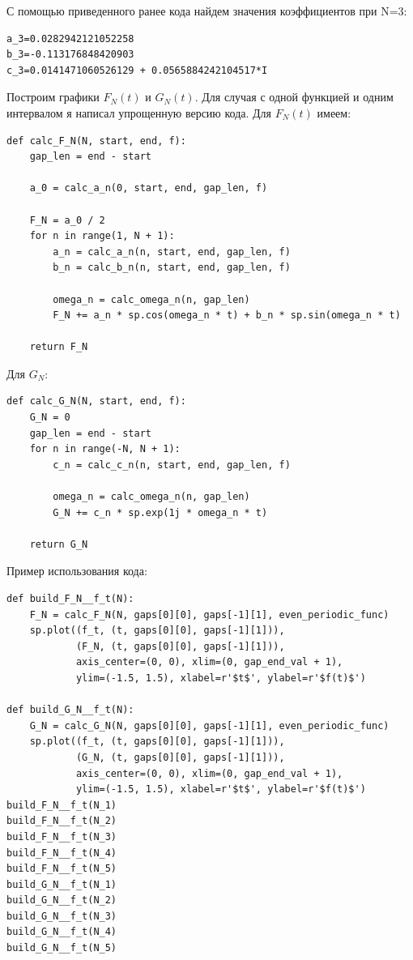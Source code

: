 \documentclass[a4paper, 16pt]{article}
\begin{document}
\noindent С помощью приведенного ранее кода найдем значения коэффициентов при N=3:
\begin{lstlisting}
a_3=0.0282942121052258
b_3=-0.113176848420903
c_3=0.0141471060526129 + 0.0565884242104517*I
\end{lstlisting}


\noindent Построим графики $F_N(t)$ и $G_N(t)$. Для случая с одной функцией и одним интервалом я написал
упрощенную версию кода. Для $F_N(t)$ имеем:
\begin{lstlisting}
def calc_F_N(N, start, end, f):
    gap_len = end - start

    a_0 = calc_a_n(0, start, end, gap_len, f)

    F_N = a_0 / 2
    for n in range(1, N + 1):
        a_n = calc_a_n(n, start, end, gap_len, f)
        b_n = calc_b_n(n, start, end, gap_len, f)

        omega_n = calc_omega_n(n, gap_len)
        F_N += a_n * sp.cos(omega_n * t) + b_n * sp.sin(omega_n * t)

    return F_N
\end{lstlisting}


\noindent Для $G_N$:
\begin{lstlisting}
def calc_G_N(N, start, end, f):
    G_N = 0
    gap_len = end - start
    for n in range(-N, N + 1):
        c_n = calc_c_n(n, start, end, gap_len, f)

        omega_n = calc_omega_n(n, gap_len)
        G_N += c_n * sp.exp(1j * omega_n * t)

    return G_N
\end{lstlisting}


\noindent Пример использования кода:
\begin{lstlisting}
def build_F_N__f_t(N):
    F_N = calc_F_N(N, gaps[0][0], gaps[-1][1], even_periodic_func)
    sp.plot((f_t, (t, gaps[0][0], gaps[-1][1])), 
            (F_N, (t, gaps[0][0], gaps[-1][1])), 
            axis_center=(0, 0), xlim=(0, gap_end_val + 1), 
            ylim=(-1.5, 1.5), xlabel=r'$t$', ylabel=r'$f(t)$')

def build_G_N__f_t(N):
    G_N = calc_G_N(N, gaps[0][0], gaps[-1][1], even_periodic_func)
    sp.plot((f_t, (t, gaps[0][0], gaps[-1][1])), 
            (G_N, (t, gaps[0][0], gaps[-1][1])), 
            axis_center=(0, 0), xlim=(0, gap_end_val + 1), 
            ylim=(-1.5, 1.5), xlabel=r'$t$', ylabel=r'$f(t)$')
build_F_N__f_t(N_1)
build_F_N__f_t(N_2)
build_F_N__f_t(N_3)
build_F_N__f_t(N_4)
build_F_N__f_t(N_5)
build_G_N__f_t(N_1)
build_G_N__f_t(N_2)
build_G_N__f_t(N_3)
build_G_N__f_t(N_4)
build_G_N__f_t(N_5)
\end{lstlisting}
\end{document}
